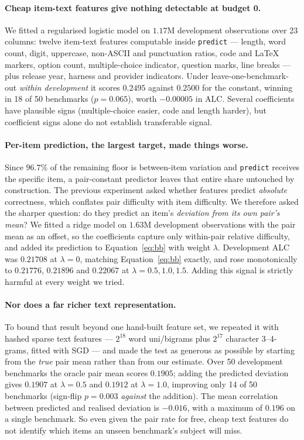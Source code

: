 \documentclass{article}
\begin{document}
\paragraph{Cheap item-text features give nothing detectable at budget 0.} We
fitted a regularised logistic model on $1.17$M development observations over 23
columns: twelve item-text features computable inside \texttt{predict} --- length, word count, digit,
uppercase, non-ASCII and punctuation ratios, code and \LaTeX{} markers, option
count, multiple-choice indicator, question marks, line breaks --- plus release
year, harness and provider indicators. Under leave-one-benchmark-out
\emph{within development} it
scores $0.2495$ against $0.2500$ for the constant, winning in 18 of 50 benchmarks
($p = 0.065$), worth $-0.00005$ in ALC. Several coefficients have plausible signs
(multiple-choice easier, code and length harder), but coefficient signs alone do
not establish transferable signal.

\paragraph{Per-item prediction, the largest target, made things worse.} Since
$96.7\%$ of the remaining floor is between-item variation and \texttt{predict}
receives the specific item, a pair-constant predictor leaves that entire share
untouched by construction. The previous experiment asked whether features predict
\emph{absolute} correctness, which conflates pair difficulty with item
difficulty. We therefore asked the sharper question: do they predict an item's
\emph{deviation from its own pair's mean}? We fitted a ridge model on $1.63$M
development observations with the pair mean as an offset, so the coefficients
capture only within-pair relative difficulty, and added its prediction to
Equation~\eqref{eq:bb} with weight $\lambda$. Development ALC was $0.21708$ at
$\lambda=0$, matching Equation~\eqref{eq:bb} exactly, and rose monotonically to
$0.21776$, $0.21896$ and $0.22067$ at $\lambda = 0.5, 1.0, 1.5$. Adding this
signal is strictly harmful at every weight we tried.

\paragraph{Nor does a far richer text representation.} To bound that result
beyond one hand-built feature set, we repeated it with hashed sparse text
features --- $2^{18}$ word uni/bigrams plus $2^{17}$ character 3--4-grams, fitted
with SGD --- and made the test as generous as possible by starting from the
\emph{true} pair mean rather than from our estimate. Over 50 development
benchmarks the oracle pair mean scores $0.1905$; adding the predicted deviation
gives $0.1907$ at $\lambda=0.5$ and $0.1912$ at $\lambda=1.0$, improving only 14
of 50 benchmarks (sign-flip $p=0.003$ \emph{against} the addition). The mean
correlation between predicted and realised deviation is $-0.016$, with a maximum
of $0.196$ on a single benchmark. So even given the pair rate for free, cheap text
features do not identify which items an unseen benchmark's subject will miss.
\end{document}
